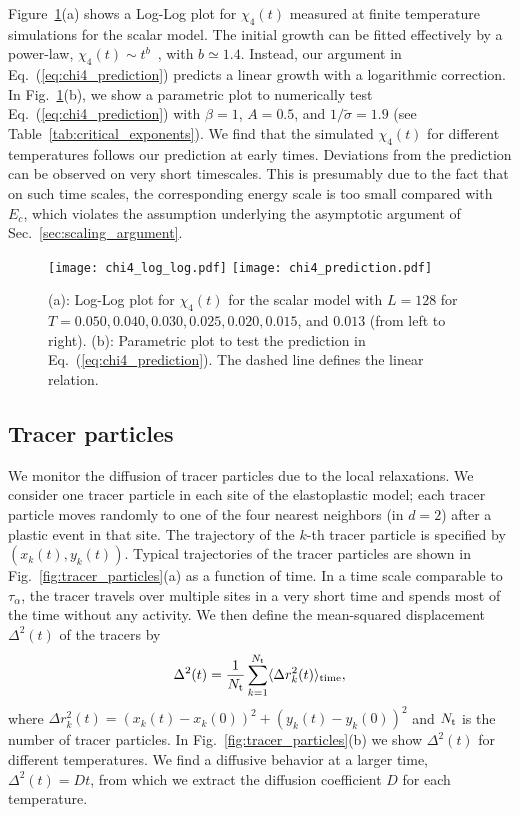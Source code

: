 \documentclass[pre,twocolumn,superscriptaddress,tightenlines,showpacs,longbibliography,floatfix,footinbib]{revtex4-1}
\begin{document}
Figure~\ref{fig:chi4_prediction}(a) shows a Log-Log plot for $\chi_4(t)$ measured at finite temperature simulations for the scalar model.
The initial growth can be fitted effectively by a power-law, $\chi_4(t) \sim t^b$~\cite{biroli2022dynamical,flenner2016dynamic}, with $b \simeq 1.4$.
Instead, our argument in Eq.~(\ref{eq:chi4_prediction}) predicts a linear growth with a logarithmic correction.
In Fig.~\ref{fig:chi4_prediction}(b), we show a parametric plot to numerically test Eq.~(\ref{eq:chi4_prediction}) with  $\beta=1$, $A=0.5$, and $1/\tilde \sigma =1.9$ (see Table~\ref{tab:critical_exponents}). 
We find that the simulated $\chi_4(t)$ for different temperatures follows our prediction at  early times. 
Deviations from the prediction can be observed on very short timescales. This is presumably due to the fact that on such time scales, the corresponding energy scale is too small compared with $E_c$, which violates the assumption underlying the asymptotic argument of Sec.~\ref{sec:scaling_argument}.


\begin{figure}
\centering
\texttt{[image: chi4\_log\_log.pdf]}
\texttt{[image: chi4\_prediction.pdf]}
\caption{(a): Log-Log plot for $\chi_4(t)$ for the scalar model with $L=128$ for $T=0.050, 0.040, 0.030, 0.025, 0.020, 0.015$, and $0.013$ (from left to right). (b): Parametric plot to test the prediction in Eq.~(\ref{eq:chi4_prediction}). The dashed line defines the linear relation.}
\label{fig:chi4_prediction}
\end{figure}



\subsection{Tracer particles}

We monitor the diffusion of tracer particles \cite{jung2004excitation,berthier2004length} due to the local relaxations.
We consider one tracer particle in each site of the elastoplastic model; each tracer particle moves randomly to one of the four nearest neighbors (in $d=2$) after a plastic event in that site.
The trajectory of the $k$-th tracer particle is specified by  $(x_k(t),y_k(t))$.
Typical trajectories of the tracer particles are shown in Fig.~\ref{fig:tracer_particles}(a) as a function of time.
In a time scale comparable to $\tau_\alpha$, the tracer travels over multiple sites in a very short time and spends most of the time without any activity.
We then define the mean-squared displacement $\Delta^2(t)$ of the tracers by
\begin{equation}
    \Delta^2(t) = \frac{1}{N_{\rm t}} \sum_{k=1}^{N_{\rm t}} \langle \Delta r_k^2(t) \rangle_{\rm time} ,
\end{equation}
where $\Delta r_k^2(t)=(x_k(t)-x_k(0))^2 + (y_k(t)-y_k(0))^2$ and $N_{\rm t}$ is the number of tracer particles.
In Fig.~\ref{fig:tracer_particles}(b) we show $\Delta^2(t)$ for different temperatures.
We find a diffusive behavior at a larger time, $\Delta^2(t) = Dt$, from which we extract the diffusion coefficient $D$ for each temperature.
\end{document}
